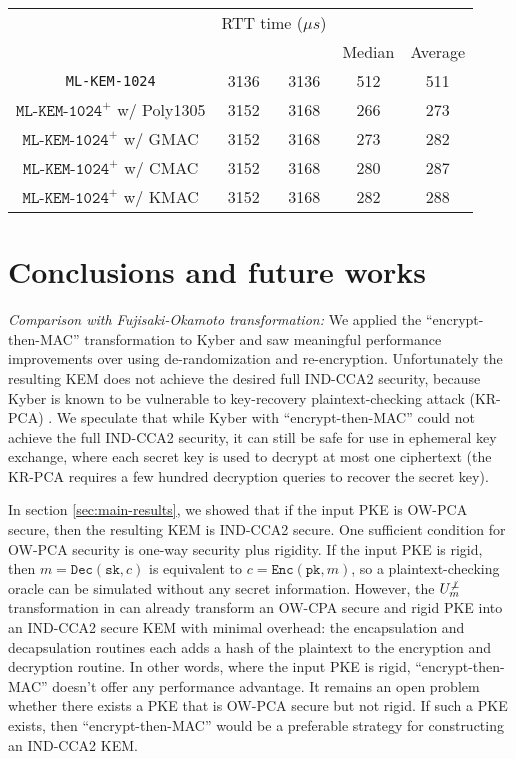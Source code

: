 \documentclass[journal=tches,submission]{iacrtrans}
\newcommand{\encrypt}{\texttt{Enc}}
\newcommand{\decrypt}{\texttt{Dec}}
\newcommand{\pk}{\texttt{pk}}
\newcommand{\sk}{\texttt{sk}}
\newcommand{\us}{\mu s}
\begin{document}
\begin{table}[H]
\begin{tabular}{|c|c|c|c|c|}
        & \multicolumn{2}{|c|}{RTT time ($\us$)} \\
        \cline{4-5}
        & & & Median & Average \\
        \hline
        \texttt{ML-KEM-1024} & 3136 & 3136 & 512 & 511 \\
        \hline
        $\texttt{ML-KEM-1024}^+$ w/ Poly1305 & 3152 & 3168 & 266 & 273 \\
        \hline
        $\texttt{ML-KEM-1024}^+$ w/ GMAC & 3152 & 3168 & 273 & 282 \\
        \hline
        $\texttt{ML-KEM-1024}^+$ w/ CMAC & 3152 & 3168 & 280 & 287 \\
        \hline
        $\texttt{ML-KEM-1024}^+$ w/ KMAC & 3152 & 3168 & 282 & 288 \\
        \hline
    \end{tabular}
\end{table}



\section{Conclusions and future works}\label{sec:future-works}
\emph{Comparison with Fujisaki-Okamoto transformation:} We applied the ``encrypt-then-MAC'' transformation to Kyber and saw meaningful performance improvements over using de-randomization and re-encryption. Unfortunately the resulting KEM does not achieve the desired full IND-CCA2 security, because Kyber is known to be vulnerable to key-recovery plaintext-checking attack (KR-PCA) \cite{ravi2019generic}\cite{ueno2022curse}. We speculate that while Kyber with ``encrypt-then-MAC'' could not achieve the full IND-CCA2 security, it can still be safe for use in ephemeral key exchange, where each secret key is used to decrypt at most one ciphertext (the KR-PCA requires a few hundred decryption queries to recover the secret key).

In section \ref{sec:main-results}, we showed that if the input PKE is OW-PCA secure, then the resulting KEM is IND-CCA2 secure. One sufficient condition for OW-PCA security is one-way security plus rigidity. If the input PKE is rigid, then $m = \decrypt(\sk, c)$ is equivalent to $c = \encrypt(\pk, m)$, so a plaintext-checking oracle can be simulated without any secret information. However, the $U_m^{\not\bot}$ transformation in \cite{hofheinz2017modular} can already transform an OW-CPA secure and rigid PKE into an IND-CCA2 secure KEM with minimal overhead: the encapsulation and decapsulation routines each adds a hash of the plaintext to the encryption and decryption routine. In other words, where the input PKE is rigid, ``encrypt-then-MAC'' doesn't offer any performance advantage. It remains an open problem whether there exists a PKE that is OW-PCA secure but not rigid. If such a PKE exists, then ``encrypt-then-MAC'' would be a preferable strategy for constructing an IND-CCA2 KEM.





\end{document}
